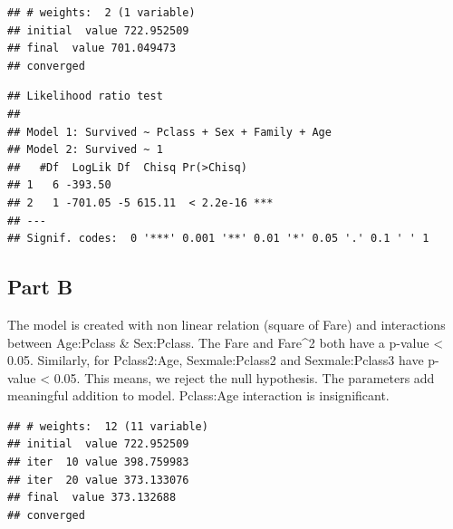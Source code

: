 \documentclass[
]{article}
\begin{document}
\begin{verbatim}
## # weights:  2 (1 variable)
## initial  value 722.952509 
## final  value 701.049473 
## converged
\end{verbatim}

\begin{verbatim}
## Likelihood ratio test
## 
## Model 1: Survived ~ Pclass + Sex + Family + Age
## Model 2: Survived ~ 1
##   #Df  LogLik Df  Chisq Pr(>Chisq)    
## 1   6 -393.50                         
## 2   1 -701.05 -5 615.11  < 2.2e-16 ***
## ---
## Signif. codes:  0 '***' 0.001 '**' 0.01 '*' 0.05 '.' 0.1 ' ' 1
\end{verbatim}

\hypertarget{part-b}{%
\subsection{Part B}\label{part-b}}

The model is created with non linear relation (square of Fare) and
interactions between Age:Pclass \& Sex:Pclass. The Fare and Fare\^{}2
both have a p-value \textless{} 0.05. Similarly, for Pclass2:Age,
Sexmale:Pclass2 and Sexmale:Pclass3 have p-value \textless{} 0.05. This
means, we reject the null hypothesis. The parameters add meaningful
addition to model. Pclass:Age interaction is insignificant.

\begin{verbatim}
## # weights:  12 (11 variable)
## initial  value 722.952509 
## iter  10 value 398.759983
## iter  20 value 373.133076
## final  value 373.132688 
## converged
\end{verbatim}
\end{document}
